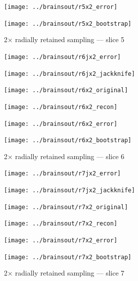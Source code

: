 \documentclass[article]{jdssv}
\begin{document}
\begin{appendix}
\begin{figure}
\begin{centering}
\parbox{\imsize}{\texttt{[image: ../brainsout/r5x2\_error]}}
\parbox{\imsize}{\texttt{[image: ../brainsout/r5x2\_bootstrap]}}

\end{centering}
\caption{2$\times$ radially retained sampling --- slice 5}
\end{figure}


\begin{figure}
\begin{centering}

\parbox{\imsize}{\texttt{[image: ../brainsout/r6jx2\_error]}}
\parbox{\imsize}{\texttt{[image: ../brainsout/r6jx2\_jackknife]}}

\vspace{\vertsep}

\parbox{\imsize}{\texttt{[image: ../brainsout/r6x2\_original]}}
\parbox{\imsize}{\texttt{[image: ../brainsout/r6x2\_recon]}}

\vspace{\vertsep}

\parbox{\imsize}{\texttt{[image: ../brainsout/r6x2\_error]}}
\parbox{\imsize}{\texttt{[image: ../brainsout/r6x2\_bootstrap]}}

\end{centering}
\caption{2$\times$ radially retained sampling --- slice 6}
\end{figure}


\begin{figure}
\begin{centering}

\parbox{\imsize}{\texttt{[image: ../brainsout/r7jx2\_error]}}
\parbox{\imsize}{\texttt{[image: ../brainsout/r7jx2\_jackknife]}}

\vspace{\vertsep}

\parbox{\imsize}{\texttt{[image: ../brainsout/r7x2\_original]}}
\parbox{\imsize}{\texttt{[image: ../brainsout/r7x2\_recon]}}

\vspace{\vertsep}

\parbox{\imsize}{\texttt{[image: ../brainsout/r7x2\_error]}}
\parbox{\imsize}{\texttt{[image: ../brainsout/r7x2\_bootstrap]}}

\end{centering}
\caption{2$\times$ radially retained sampling --- slice 7}
\end{figure}


\begin{figure}
\begin{centering}


\end{centering}
\end{figure}
\end{appendix}
\end{document}
